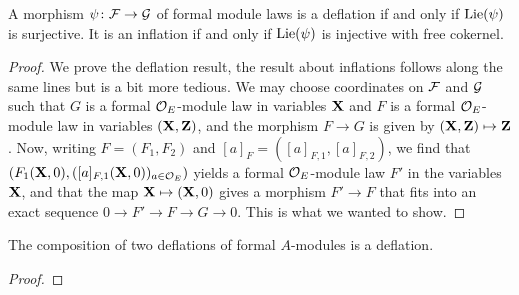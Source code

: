\documentclass[../main.tex]{subfiles}
\begin{document}
\begin{lem}\label{lem:ClassificationOfInflAndDefl}
  A morphism $\psi\colon \mathcal{F} \to \mathcal{G}$ of formal module laws is a  deflation
  if and only if $\operatorname{Lie}(\psi)$ is surjective. It is an inflation if and only
  if $\operatorname{Lie}(\psi)$ is injective with free cokernel.
  \begin{proof}[Proof]
    We prove the deflation result, the result about inflations follows along the
    same lines but is a bit more tedious. We may choose 
    coordinates on $\mathcal{F}$ and $\mathcal{G}$ such that $G$ is a formal $\mathcal{O}_E$-module law
    in variables $\mathbf{X}$ and $F$ is a formal $\mathcal{O}_E$-module law in variables
    $(\mathbf{X}, \mathbf{Z})$, and the morphism $F \to G$ is given by $(\mathbf{X}, \mathbf{Z}) \mapsto
    \mathbf{Z}$. Now, writing $F = (F_1, F_2)$ and $[a]_F = ([a]_{F,1}, [a]_{F,2})$, we find
    that $(F_1(\mathbf{X}, 0), ([a]_{F,1}(\mathbf{X}, 0))_{a \in \mathcal{O}_E})$ yields a formal
    $\mathcal{O}_E$-module law $F'$ in the variables $\mathbf{X}$, and that the map
    $\mathbf{X} \mapsto (\mathbf{X}, 0)$ gives a morphism $F' \to F$ that fits into an exact sequence
      $0 \to F' \to F \to G \to 0$. This is what we wanted to show.
  \end{proof}
\end{lem}

\begin{lem}
  The composition of two deflations of formal $A$-modules is a deflation.
\begin{proof}
\end{proof}
\end{lem}
\end{document}
